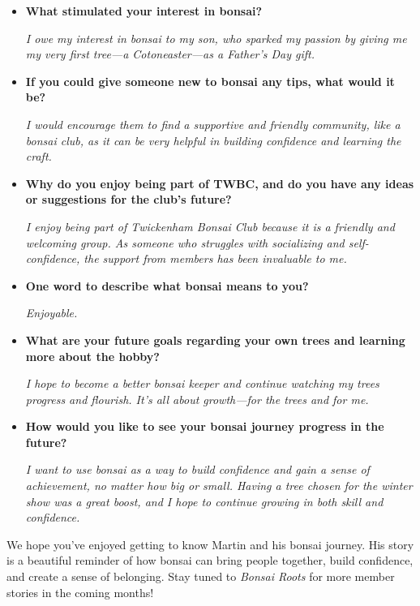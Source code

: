 \begin{itemize}
    \item \textbf{What stimulated your interest in bonsai?}
    
    \emph{I owe my interest in bonsai to my son, who sparked my passion by giving me my very first tree---a Cotoneaster---as a Father's Day gift.}

    \item \textbf{If you could give someone new to bonsai any tips, what would it be?}
    
    \emph{I would encourage them to find a supportive and friendly community, like a bonsai club, as it can be very helpful in building confidence and learning the craft.}

    \item \textbf{Why do you enjoy being part of TWBC, and do you have any ideas or suggestions for the club's future?}
    
    \emph{I enjoy being part of Twickenham Bonsai Club because it is a friendly and welcoming group. As someone who struggles with socializing and self\--confidence, the support from members has been invaluable to me.}

    \item \textbf{One word to describe what bonsai means to you?}
    
    \emph{Enjoyable.}

    \item \textbf{What are your future goals regarding your own trees and learning more about the hobby?}
    
    \emph{I hope to become a better bonsai keeper and continue watching my trees progress and flourish. It's all about growth---for the trees and for me.}

    \item \textbf{How would you like to see your bonsai journey progress in the future?}
    
    \emph{I want to use bonsai as a way to build confidence and gain a sense of achievement, no matter how big or small. Having a tree chosen for the winter show was a great boost, and I hope to continue growing in both skill and confidence.}

\end{itemize}

\noindent
We hope you've enjoyed getting to know Martin and his bonsai journey. His story is a beautiful reminder of how bonsai can bring people together, build confidence, and create a sense of belonging. Stay tuned to \emph{Bonsai Roots} for more member stories in the coming months!

